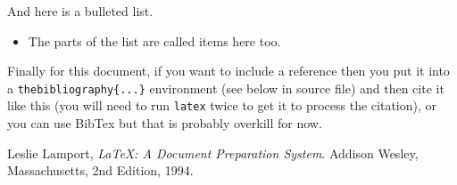 \documentclass[a4wide, 11pt]{article}
\begin{document}
And here is a bulleted list.

\begin{itemize}

    \item
    The parts of the list are called items here too.
    
\end{itemize}

Finally for this document, if you want to include a reference
then you put it into a \texttt{thebibliography\{...\}}
environment (see below in source file) and then 
cite it like this \cite{lamport94}
(you will need to run \texttt{latex} twice to get it to process the citation),
or you can use BibTex but that is probably overkill for now.

\begin{thebibliography}{9}

  Leslie Lamport,
  \emph{\LaTeX: A Document Preparation System}.
  Addison Wesley, Massachusetts,
  2nd Edition,
  1994.

\end{thebibliography}
\end{document}
